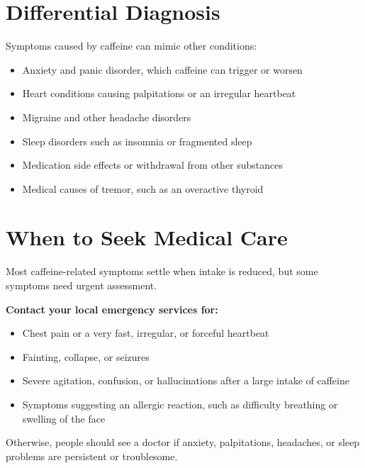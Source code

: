 \section*{Differential Diagnosis}
Symptoms caused by caffeine can mimic other conditions:
\begin{itemize}
    \item Anxiety and panic disorder, which caffeine can trigger or worsen
    \item Heart conditions causing palpitations or an irregular heartbeat
    \item Migraine and other headache disorders
    \item Sleep disorders such as insomnia or fragmented sleep
    \item Medication side effects or withdrawal from other substances
    \item Medical causes of tremor, such as an overactive thyroid
\end{itemize}

\section*{When to Seek Medical Care}
Most caffeine-related symptoms settle when intake is reduced, but some symptoms need urgent assessment.

\textbf{Contact your local emergency services for:}
\begin{itemize}
    \item Chest pain or a very fast, irregular, or forceful heartbeat
    \item Fainting, collapse, or seizures
    \item Severe agitation, confusion, or hallucinations after a large intake of caffeine
    \item Symptoms suggesting an allergic reaction, such as difficulty breathing or swelling of the face
\end{itemize}

Otherwise, people should see a doctor if anxiety, palpitations, headaches, or sleep problems are persistent or troublesome.

